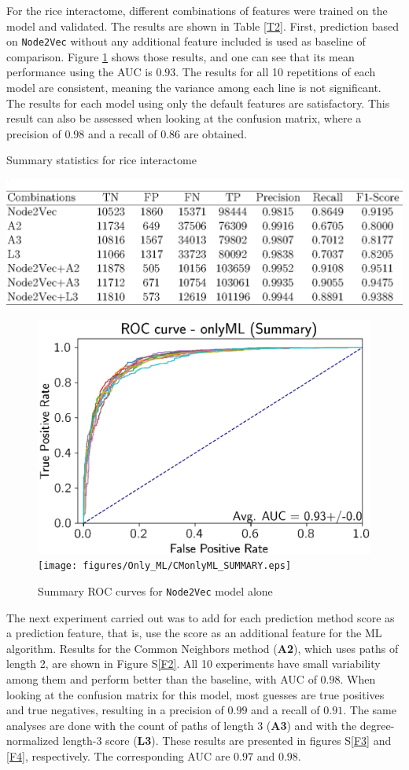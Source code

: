 
For the rice interactome, different combinations of features were
trained on the model and validated. The results are shown in Table
\ref{T2}. First, prediction based on \texttt{Node2Vec} without any
additional feature included is used as baseline of comparison. Figure
\ref{F1} shows those results, and one can see that its mean performance
using the AUC is $0.93$. The results for all 10 repetitions of each
model are consistent, meaning the variance among each line is not
significant. The results for each model using only the default features
are satisfactory. This result can also be assessed when looking at
the confusion matrix, where a precision of $0.98$ and a recall of
$0.86$ are obtained.

\begin{table}
\caption{\label{T2}Summary statistics for rice interactome}
\includegraphics[width=1\columnwidth]{figures/T2.eps}
\end{table}

\begin{figure}[h]
\noindent \begin{centering}
\caption{\label{F1}Summary ROC curves for \texttt{Node2Vec} model alone}
\par\end{centering}
\noindent \raggedleft{}\includegraphics[width=0.48\columnwidth]{figures/Only_ML/ROConlyML_SUMMARY.eps}\texttt{[image: figures/Only\_ML/CMonlyML\_SUMMARY.eps]}
\end{figure}

The next experiment carried out was to add for each prediction method
score as a prediction feature, that is, use the score as an additional
feature for the ML algorithm. Results for the Common Neighbors method
(\textbf{A2}), which uses paths of length 2, are shown in Figure S\ref{F2}.
All 10 experiments have small variability among them and perform better
than the baseline, with AUC of $0.98$. When looking at the confusion
matrix for this model, most guesses are true positives and true negatives,
resulting in a precision of $0.99$ and a recall of $0.91$. The same
analyses are done with the count of paths of length 3 (\textbf{A3})
and with the degree-normalized length-3 score (\textbf{L3}). These
results are presented in figures S\ref{F3} and \ref{F4}, respectively.
The corresponding AUC are $0.97$ and $0.98$.


